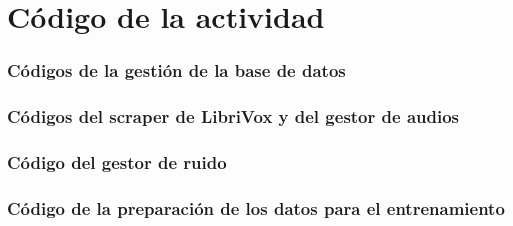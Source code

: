 \chapter{Código de la actividad}

\subsection{Códigos de la gestión de la base de datos}


\subsection{Códigos del scraper de LibriVox y del gestor de audios}




\subsection{Código del gestor de ruido}


\subsection{Código de la preparación de los datos para el entrenamiento}

